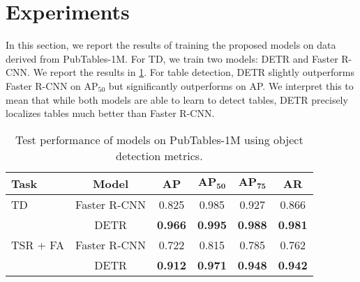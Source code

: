 \documentclass[10pt,twocolumn,letterpaper]{article}
\begin{document}
\section{Experiments}\label{sec:experiments}

In this section, we report the results of training the proposed models on data derived from PubTables-1M.
For TD, we train two models: DETR and Faster R-CNN.
We report the results in \cref{detection-results}.
For table detection, DETR slightly outperforms Faster R-CNN on $\textrm{AP}_\textrm{50}$ but significantly outperforms on AP.
We interpret this to mean that while both models are able to learn to detect tables, DETR precisely localizes tables much better than Faster R-CNN.

\begin{table}[!t]
  \footnotesize
  \caption{Test performance of models on PubTables-1M using object detection metrics.}
  \label{detection-results}
  \centering
  \begin{tabular}{lccccc}
    \toprule
    \textbf{Task} & \textbf{Model} & \textbf{AP} & $\textbf{AP}_\textbf{50}$ & $\textbf{AP}_\textbf{75}$ & \textbf{AR}\\
    \midrule
    TD & Faster R-CNN & 0.825 & 0.985 & 0.927 & 0.866 \\
    & DETR & \textbf{0.966} & \textbf{0.995} & \textbf{0.988} & \textbf{0.981} \\
    \midrule
    TSR + FA & Faster R-CNN & 0.722 & 0.815 & 0.785 & 0.762 \\
    & DETR & \textbf{0.912} & \textbf{0.971} & \textbf{0.948} & \textbf{0.942} \\
    \midrule
  \end{tabular}
\end{table}
\end{document}

